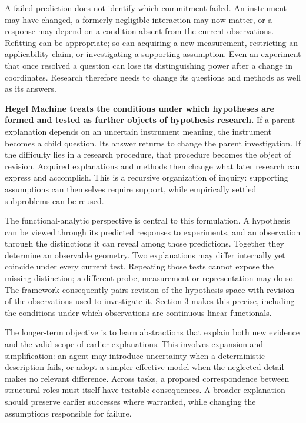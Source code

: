 \documentclass[11pt,a4paper]{article}
\begin{document}
A failed prediction does not identify which commitment failed. An instrument may have changed, a formerly negligible interaction may now matter, or a response may depend on a condition absent from the current observations. Refitting can be appropriate; so can acquiring a new measurement, restricting an applicability claim, or investigating a supporting assumption. Even an experiment that once resolved a question can lose its distinguishing power after a change in coordinates. Research therefore needs to change its questions and methods as well as its answers.


\textbf{Hegel Machine treats the conditions under which hypotheses are formed and tested as further objects of hypothesis research.} If a parent explanation depends on an uncertain instrument meaning, the instrument becomes a child question. Its answer returns to change the parent investigation. If the difficulty lies in a research procedure, that procedure becomes the object of revision. Acquired explanations and methods then change what later research can express and accomplish. This is a recursive organization of inquiry: supporting assumptions can themselves require support, while empirically settled subproblems can be reused.


The functional-analytic perspective is central to this formulation. A hypothesis can be viewed through its predicted responses to experiments, and an observation through the distinctions it can reveal among those predictions. Together they determine an observable geometry. Two explanations may differ internally yet coincide under every current test. Repeating those tests cannot expose the missing distinction; a different probe, measurement or representation may do so. The framework consequently pairs revision of the hypothesis space with revision of the observations used to investigate it. Section 3 makes this precise, including the conditions under which observations are continuous linear functionals.


The longer-term objective is to learn abstractions that explain both new evidence and the valid scope of earlier explanations. This involves expansion and simplification: an agent may introduce uncertainty when a deterministic description fails, or adopt a simpler effective model when the neglected detail makes no relevant difference. Across tasks, a proposed correspondence between structural roles must itself have testable consequences. A broader explanation should preserve earlier successes where warranted, while changing the assumptions responsible for failure.
\end{document}
